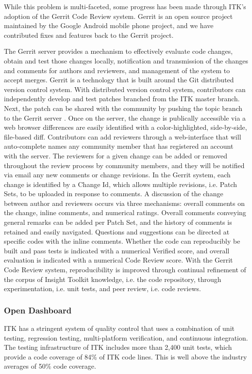 \documentclass{frontiersENG} %
\begin{document}
While this problem is multi-faceted, some progress has been made through ITK’s adoption of the Gerrit Code Review system.  Gerrit is an open source project maintained by the Google Android mobile phone project, and we have contributed fixes and features back to the Gerrit project.

The Gerrit server provides a mechanism to effectively evaluate code changes, obtain and test those changes locally, notification and transmission of the changes and comments for authors and reviewers, and management of the system to accept merges.  Gerrit is a technology that is built around the Git distributed version control system.  With distributed version control system, contributors can independently develop and test patches branched from the ITK master branch. Next, the patch can be shared with the community by pushing the topic branch to the Gerrit server \cite{ITKGerrit}.  Once on the server, the change is publically accessible via a web browser differences are easily identified with a color-highlighted, side-by-side, file-based diff.  Contributors can add reviewers through a web-interface that will auto-complete names any community member that has registered an account with the server.  The reviewers for a given change can be added or removed throughout the review process by community members, and they will be notified via email any new comments or change revisions.  In the Gerrit system, each change is identified by a Change Id, which allows multiple revisions, i.e. Patch Sets, to be uploaded in response to comments.  A discussion of the change between author and reviewers occurs via three mechanisms: overall comments on the change, inline comments, and numerical ratings.  Overall comments conveying general remarks can be added per Patch Set, and the history of comments is retained and easily navigated. Questions and suggestions can be directed at specific codes with the inline comments.  Whether the code can reproducibly be built and pass tests is indicated with a numerical Verified score, and overall evaluation is indicated with a numerical Code Review score.  With the Gerrit Code Review system, reproducibility is improved through continual refinement of the corpus of Insight Toolkit knowledge, i.e. the code repository, through experimentation, i.e. unit tests, and peer review, i.e. code reviews.

\subsubsection{Open Dashboard}
ITK has a stringent system of quality control that uses a combination of unit testing, regression testing, multi-platform verification, and continuous integration. The testing infrastructure of ITK includes more than 2,400 unit tests, which provide a code coverage of 84\% of ITK code lines. This is well above the industry averages of 50\% code coverage.
\end{document}
